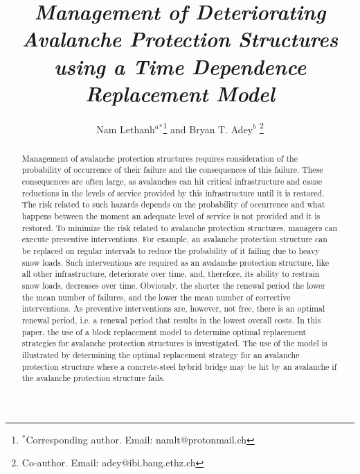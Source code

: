\documentclass[]{article}
\begin{document}


\title{\textit{Management of Deteriorating Avalanche Protection Structures using a Time Dependence Replacement Model}}

\author{
Nam Lethanh$^{a}$$^{\ast}$\thanks{$^\ast$Corresponding author. Email: namlt@protonmail.ch}
\vspace{6pt} and Bryan T. Adey$^{b}$ \thanks{Co-author. Email: adey@ibi.baug.ethz.ch}
\\
}

\maketitle

\begin{abstract}
Management of avalanche protection structures requires consideration
of the probability of occurrence of their failure and the consequences
of this failure. These consequences are often large, as avalanches
can hit critical infrastructure and cause reductions in the levels
of service provided by this infrastructure until it is restored. The
risk related to such hazards depends on the probability of occurrence
and what happens between the moment an adequate level of service is
not provided and it is restored. To minimize the risk related to avalanche
protection structures, managers can execute preventive interventions.
For example, an avalanche protection structure can be replaced on
regular intervals to reduce the probability of it failing due to heavy
snow loads. Such interventions are required as an avalanche protection
structure, like all other infrastructure, deteriorate over time, and,
therefore, its ability to restrain snow loads, decreases over time.
Obviously, the shorter the renewal period the lower the mean number
of failures, and the lower the mean number of corrective interventions.
As preventive interventions are, however, not free, there is an optimal
renewal period, i.e. a renewal period that results in the lowest overall
costs. In this paper, the use of a block replacement model to determine
optimal replacement strategies for avalanche protection structures
is investigated. The use of the model is illustrated by determining
the optimal replacement strategy for an avalanche protection structure
where a concrete-steel hybrid bridge may be hit by an avalanche if
the avalanche protection structure fails.
\end{abstract}
\end{document}
